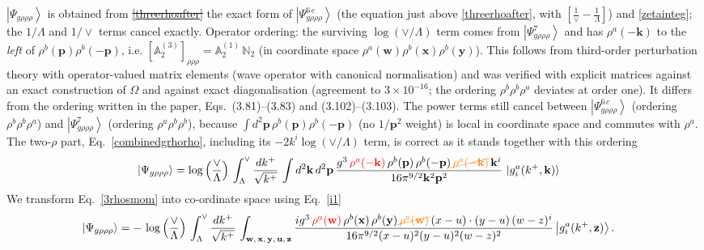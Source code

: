 \documentclass[aps,prd,amsmath,amssymb,nofootinbib]{revtex4-2}
\def\mf#1{\mathbb{#1}}
\numberwithin{equation}{section}
\begin{document}
$\left|\Psi_{g\rho\rho\rho}\right\rangle$ is obtained from {\color{orange}\sout{\eqref{threerhoafter}}}{\color{red} the exact form of $\left|\Psi_{g\rho\rho\rho}^{6\,c}\right\rangle$ (the equation just above \eqref{threerhoafter}, with $\left[\frac{1}{\vee}-\frac{1}{\Lambda}\right]$)} and \eqref{zetainteg}{\color{red}; the $1/\Lambda$ and $1/\vee$ terms cancel exactly. Operator ordering: the surviving $\log(\vee/\Lambda)$ term comes from $\left|\Psi^{7}_{g\rho\rho\rho}\right\rangle$ and has $\rho^a(-\mathbf{k})$ to the \emph{left} of $\rho^b(\mathbf{p})\rho^b(-\mathbf{p})$, i.e. $[\mf{A}^{(3)}_2]_{\rho\rho\rho}=\mf{A}^{(1)}_2\,\mf{N}_2$ (in coordinate space $\rho^a(\mathbf{w})\rho^b(\mathbf{x})\rho^b(\mathbf{y})$). This follows from third-order perturbation theory with operator-valued matrix elements (wave operator with canonical normalisation) and was verified with explicit matrices against an exact construction of $\Omega$ and against exact diagonalisation (agreement to $3\times10^{-16}$; the ordering $\rho^b\rho^b\rho^a$ deviates at order one). It differs from the ordering written in the paper, Eqs.~(3.81)--(3.83) and (3.102)--(3.103). The power terms still cancel between $\left|\Psi^{6\,c}_{g\rho\rho\rho}\right\rangle$ (ordering $\rho^b\rho^b\rho^a$) and $\left|\Psi^{7}_{g\rho\rho\rho}\right\rangle$ (ordering $\rho^a\rho^b\rho^b$), because $\int d^{2}\mathbf{p}\,\rho^b(\mathbf{p})\rho^b(-\mathbf{p})$ (no $1/\mathbf{p}^2$ weight) is local in coordinate space and commutes with $\rho^a$. The two-$\rho$ part, Eq.~\eqref{combinedgrhorho}, including its $-2k^i\log(\vee/\Lambda)$ term, is correct as it stands together with this ordering}
\begin{align}\label{3rhosmom}
    \left|\Psi_{g\rho\rho\rho}\right\rangle & = \log{\left(\frac{\vee}{\Lambda}\right)}\,\int_{\Lambda}^{\vee}\frac{dk^{+}}{\sqrt{k^{+}}}\,\int d^{2}\mathbf{k}\, d^{2}\mathbf{p}\,\frac{g^{3}\,{\color{red}\rho^{a}(-\mathbf{k})}\,\rho^{b}(\mathbf{p})\,\rho^{b}(-\mathbf{p}){\color{orange}\cancel{\,\rho^{a}(-\mathbf{k})}}\, \mathbf{k}^{i}}{16\pi^{9/2}\mathbf{k}^{2}\mathbf{p}^{2}}\, \ket{g^{a}_{i}(k^{+},\mathbf{k})}
\end{align}
We transform Eq.~\eqref{3rhosmom} into co-ordinate space using Eq.~\eqref{i1}
\begin{align}\label{3rhospos}
 \left|\Psi_{g\rho\rho\rho}\right\rangle & =  -\,\log{\left(\frac{\vee}{\Lambda}\right)}\,\int_{\Lambda}^{\vee}\frac{dk^{+}}{\sqrt{k^{+}}}\,\int_{\mathbf{w},\, \mathbf{x},\, \mathbf{y},\, \mathbf{u},\, \mathbf{z}}\frac{ig^{3}\,{\color{red}\rho^{a}(\mathbf{w})}\,\rho^{b}(\mathbf{x})\,\rho^{b}(\mathbf{y}){\color{orange}\cancel{\,\rho^{a}(\mathbf{w})}}\, (x-u)\cdot (y-u)\,(w-z)^{i}}{16\pi^{9/2}(x-u)^{2}(y-u)^{2}(w-z)^{2}}\left|g_{i}^{a}(k^{+},\mathbf{z})\right\rangle .
\end{align}
\end{document}
